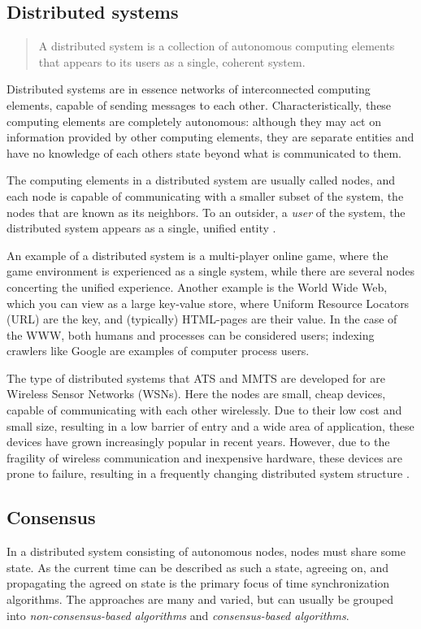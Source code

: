 \documentclass[a4paper,12pt]{article}
\begin{document}
\subsection{Distributed systems}

\begin{quote}
  A distributed system is a collection of autonomous computing
  elements that appears to its users as a single, coherent
  system.\citep{TanenbaumSteen06}
\end{quote}

Distributed systems are in essence networks of interconnected computing elements, capable of sending messages to each other. Characteristically, these computing elements are completely autonomous: although they may act on information provided by other computing elements, they are separate entities and have no knowledge of each others state beyond what is communicated to them.

The computing elements in a distributed system are usually called nodes, and each node is capable of communicating with a smaller subset of the system, the nodes that are known as its neighbors. To an outsider, a \textit{user} of the system, the distributed system appears as a single, unified entity \citep{TanenbaumSteen06}.

An example of a distributed system is a multi-player online game, where
the game environment is experienced as a single system, while there
are several nodes concerting the unified experience.  Another example
is the World Wide Web, which you can view as a large key-value store,
where Uniform Resource Locators (URL) are the key, and (typically)
HTML-pages are their value.  In the case of the WWW, both humans and
processes can be considered users; indexing crawlers like Google are
examples of computer process users.

The type of distributed systems that ATS and MMTS are developed for are Wireless Sensor
Networks (WSNs). Here the nodes are small, cheap devices, capable of communicating with each other wirelessly. Due to their low cost and small size, resulting in a low barrier of entry and a wide area of application, these devices have grown increasingly popular in recent years. However, due to the fragility of wireless communication and inexpensive hardware, these devices are prone to failure, resulting in a frequently changing distributed system structure \citep{LucaFiorentin11}.

\subsection{Consensus}
In a distributed system consisting of autonomous nodes, nodes must share some state. As the current time can be described as such a state, agreeing on, and propagating the agreed on state is the primary focus of time synchronization algorithms. The approaches are many and varied, but can usually be grouped into \textit{non-consensus-based algorithms} and \textit{consensus-based algorithms}.
\end{document}
